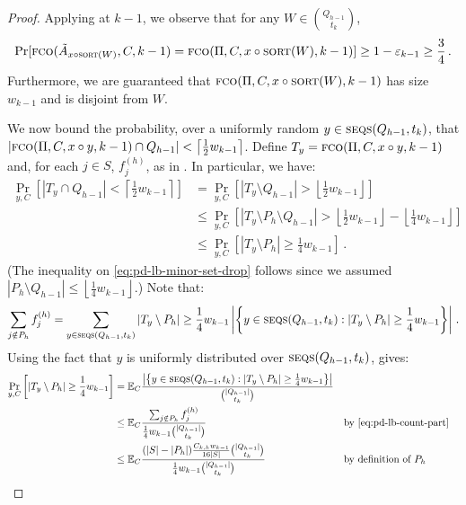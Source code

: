 \documentclass[10pt,a4paper]{article}
\theoremstyle{definition}
\theoremstyle{remark}
\newcommand{\EE}{\mathbb{E}}
\newcommand{\ceil}[1]{{\left\lceil{#1}\right\rceil}}
\newcommand{\floor}[1]{{\left\lfloor{#1}\right\rfloor}}
\let\epsilon\varepsilon
\newcommand{\fco}{\textsc{fco}\xspace}
\newcommand{\sort}{\textsc{sort}\xspace}
\newcommand{\concat}{\mathbin{\circ}}       %
\newcommand{\SSD}[2]{\textsc{seqs}(#1,#2)}  %
\begin{document}
\begin{itemize}
\begin{itemize}
\begin{proof}
  Applying  at $k-1$, we observe that for any $W \in \binom{Q_{h-1}}{t_k}$,
  \begin{align*}
    \Pr[\fco(\tilde{A}_{x \concat \sort(W)}, C, k-1) = \fco(\Pi, C, x \concat \sort(W), k-1)] 
    \ge 1 - \epsilon_{k-1} \ge \frac{3}{4} \,.
  \end{align*}
  Furthermore, we are guaranteed that $\fco(\Pi, C, x \concat \sort(W), k-1)$
  has size $w_{k-1}$ and is disjoint from $W$.
  
  We now bound the probability, over a uniformly random $y \in
  \SSD{Q_{h-1}}{t_k}$, that $|\fco(\Pi, C, x \concat y, k-1) \cap
  Q_{h-1}| < \ceil{\frac{1}{2} w_{k-1}}$. Define $T_y = \fco(\Pi, C, x \concat y, k-1)$ and, for each $j\in S$,
  $f_j^{(h)}$, as in . In particular, we have:
  \begin{align}
    \Pr_{y,C}\left[|T_y \cap Q_{h-1}| < \ceil{\frac{1}{2} w_{k-1}} \right]
      &= \Pr_{y,C}\left[|T_y \setminus Q_{h-1}| > \floor{\frac{1}{2} w_{k-1}} \right] \nonumber \\
      &\le \Pr_{y,C}\left[|T_y \setminus P_h \setminus Q_{h-1}| > \floor{\frac{1}{2} w_{k-1}} - \floor{\frac{1}{4} w_{k-1}} \right] \label{eq:pd-lb-minor-set-drop} \\
      &\le \Pr_{y,C}\left[|T_y \setminus P_h| \ge \frac{1}{4} w_{k-1} \right] \,. \nonumber
  \end{align}
  (The inequality on \cref{eq:pd-lb-minor-set-drop} follows since we
  assumed $|P_h \setminus Q_{h-1}| \le \floor{\frac{1}{4} w_{k-1}}$.) Note that:
  \begin{align}
    \sum_{j \notin P_h} f_j^{(h)} = \sum_{y \in \SSD{Q_{h-1}}{t_k}} |T_y \setminus P_h| \ge \frac{1}{4} w_{k-1} \left|\left\{y \in \SSD{Q_{h-1}}{t_k} : |T_y \setminus P_h| \ge \frac{1}{4} w_{k-1}\right\}\right| \label{eq:pd-lb-count-part} \,.
  \end{align}
  Using the fact that $y$ is uniformly distributed over $\SSD{Q_{h-1}}{t_k}$, gives:
  \begin{align*}
    \Pr_{y,C}\left[|T_y \setminus P_h| \ge \frac{1}{4} w_{k-1} \right]
      &= \EE_C \frac{\left|\left\{y \in \SSD{Q_{h-1}}{t_k} : |T_y \setminus P_h| \ge \frac{1}{4} w_{k-1}\right\}\right|}{\binom{|Q_{h-1}|}{t_k}} \\ 
      &\le \EE_C \frac{\sum_{j \notin P_h} f_j^{(h)}}{\frac{1}{4} w_{k-1} \binom{|Q_{h-1}|}{t_k}} && \text{by \cref{eq:pd-lb-count-part}}\\ 
      &\le \EE_C \frac{(|S|-|P_h|) \frac{C_{k,h} w_{k-1}}{16 |S|} \binom{|Q_{h-1}|}{t_k} }{\frac{1}{4} w_{k-1} \binom{|Q_{h-1}|}{t_k}} &&\text{by definition of $P_h$} \\

\end{align*}
\end{proof}
\end{itemize}
\end{itemize}
\end{document}
